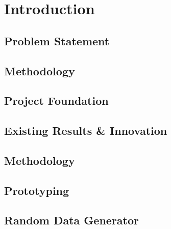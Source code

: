 \chapter{Introduction}\label{ch:introduction}


\section{Problem Statement}


\section{Methodology}


\section{Project Foundation}

\section {Existing Results \& Innovation}\label{sec:existing_results_innovation}


\section{Methodology}\label{sec:methodology}

\section{Prototyping}\label{sec:prototyping}

\section{Random Data Generator}\label{sec:random_data_generator}
